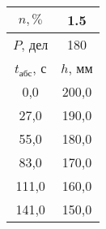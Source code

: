 \begin{tabular}[t]{|c|c|}
\hline
$n, \%$ & 1.5 \\
\hline
$P$, дел & 180 \\
\hline
$t_{абс}$, с & $h$, мм \\ 
\hline
0,0 & 200,0 \\ 
27,0 & 190,0 \\ 
55,0 & 180,0 \\ 
83,0 & 170,0 \\ 
111,0 & 160,0 \\ 
141,0 & 150,0 \\ 
\hline
\end{tabular}